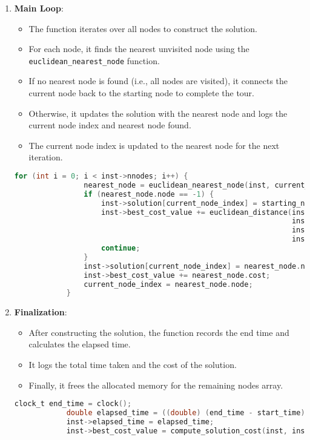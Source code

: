 \documentclass{article}
\begin{document}
\begin{enumerate}
	\item \textbf{Main Loop}:
	      \begin{itemize}
		      \item The function iterates over all nodes to construct the solution.
		      \item For each node, it finds the nearest unvisited node using the \texttt{euclidean\_nearest\_node} function.
		      \item If no nearest node is found (i.e., all nodes are visited), it connects the current node back to the starting node to complete the tour.
		      \item Otherwise, it updates the solution with the nearest node and logs the current node index and nearest node found.
		      \item The current node index is updated to the nearest node for the next iteration.
	      \end{itemize}
		  \begin{lstlisting}[language=C]
			for (int i = 0; i < inst->nnodes; i++) {
				nearest_node = euclidean_nearest_node(inst, current_node_index, remaining_nodes, &remaining_nodes_count);
				if (nearest_node.node == -1) {
					inst->solution[current_node_index] = starting_node;
					inst->best_cost_value += euclidean_distance(inst->xcoord[current_node_index],
																inst->ycoord[current_node_index],
																inst->xcoord[starting_node],
																inst->ycoord[starting_node], false);
					continue;
				}
				inst->solution[current_node_index] = nearest_node.node;
				inst->best_cost_value += nearest_node.cost;
				current_node_index = nearest_node.node;
    		}
		  \end{lstlisting}

	\item \textbf{Finalization}:
	      \begin{itemize}
		      \item After constructing the solution, the function records the end time and calculates the elapsed time.
		      \item It logs the total time taken and the cost of the solution.
		      \item Finally, it frees the allocated memory for the remaining nodes array.
	      \end{itemize}
		\begin{lstlisting}[language=C]
			clock_t end_time = clock();
			double elapsed_time = ((double) (end_time - start_time)) / CLOCKS_PER_SEC;
			inst->elapsed_time = elapsed_time;
			inst->best_cost_value = compute_solution_cost(inst, inst->solution);
		\end{lstlisting}
\end{enumerate}
\end{document}
